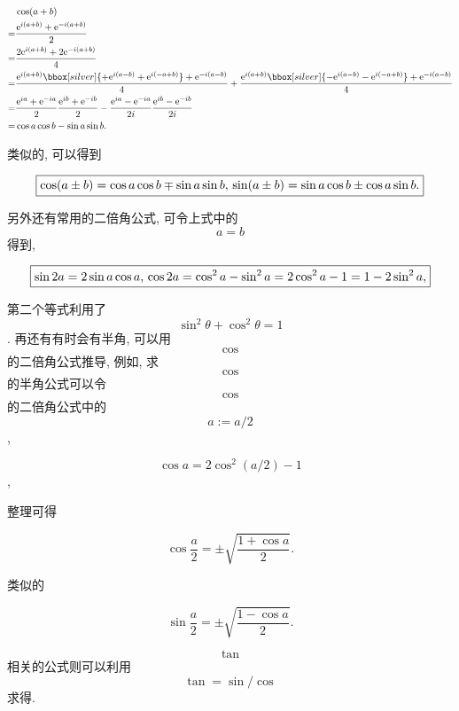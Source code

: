 \[\begin{aligned}&\cos(a+b)\\
=&\frac{\mathrm{e}^{i(a+b)}+\mathrm{e}^{-i(a+b)}}{2}\\
=&\frac{2\mathrm{e}^{i(a+b)}+2\mathrm{e}^{-i(a+b)}}{4}\\
=&\frac{\mathrm{e}^{i(a+b)}\bbox[silver]{+\mathrm{e}^{i(a-b)}+\mathrm{e}^{i(-a+b)}}+\mathrm{e}^{-i(a-b)}}{4}+\frac{\mathrm{e}^{i(a+b)}\bbox[silver]{-\mathrm{e}^{i(a-b)}-\mathrm{e}^{i(-a+b)}}+\mathrm{e}^{-i(a-b)}}{4}\\
=&\frac{\mathrm{e}^{ia}+\mathrm{e}^{-ia}}{2}\frac{\mathrm{e}^{ib}+\mathrm{e}^{-ib}}{2}-\frac{\mathrm{e}^{ia}-\mathrm{e}^{-ia}}{2i}\frac{\mathrm{e}^{ib}-\mathrm{e}^{-ib}}{2i}\\
=&\cos a\cos b-\sin a\sin b.\end{aligned}\]

类似的, 可以得到

\[\boxed{\cos(a\pm b)=\cos a\cos b\mp \sin a \sin b,\\
\sin(a\pm b)=\sin a\cos b\pm \cos a\sin b.}\]

另外还有常用的二倍角公式, 可令上式中的 \[a=b\] 得到,

\[\boxed{\sin2a=2\sin a\cos a,\\
\cos2a=\cos^2a-\sin^2a=2\cos^2a-1=1-2\sin^2a,}\]

第二个等式利用了 \[\sin^2\theta+\cos^2\theta=1\]. 再还有有时会有半角,
可以用 \[\cos\] 的二倍角公式推导, 例如, 求 \[\cos\] 的半角公式可以令
\[\cos\] 的二倍角公式中的 \[a:=a/2\],

\[\cos a=2\cos^2(a/2)-1\],

整理可得

\[\boxed{\cos\frac{a}{2}=\pm\sqrt{\frac{1+\cos a}{2}}}.\]

类似的

\[\boxed{\sin\frac{a}{2}=\pm\sqrt{\frac{1-\cos a}{2}}}.\]

\[\tan\] 相关的公式则可以利用 \[\tan=\sin/\cos\] 求得.
